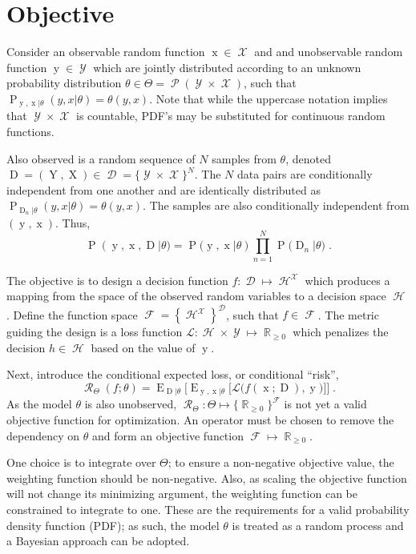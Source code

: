 \documentclass[12pt]{article}
\DeclareMathOperator{\xrm}{\mathrm{x}}
\DeclareMathOperator{\Xrm}{\mathrm{X}}
\DeclareMathOperator{\yrm}{\mathrm{y}}
\DeclareMathOperator{\Yrm}{\mathrm{Y}}
\DeclareMathOperator{\Drm}{\mathrm{D}}
\DeclareMathOperator{\Prm}{\mathrm{P}}
\DeclareMathOperator{\Erm}{\mathrm{E}}
\DeclareMathOperator{\Xcal}{\mathcal{X}}
\DeclareMathOperator{\Ycal}{\mathcal{Y}}
\DeclareMathOperator{\Dcal}{\mathcal{D}}
\DeclareMathOperator{\Hcal}{\mathcal{H}}
\DeclareMathOperator{\Fcal}{\mathcal{F}}
\DeclareMathOperator{\Rcal}{\mathcal{R}}
\DeclareMathOperator{\Pcal}{\mathcal{P}}
\DeclareMathOperator{\Rbb}{\mathbb{R}}
\begin{document}
\section{Objective}

Consider an observable random function $\xrm \in \Xcal$ and and unobservable random function $\yrm \in \Ycal$ which are jointly distributed according to an unknown probability distribution $\theta \in \Theta = \Pcal(\Ycal \times \Xcal)$, such that $\Prm_{\yrm,\xrm | \theta}(y,x | \theta) = \theta(y,x)$. Note that while the uppercase notation implies that $\Ycal \times \Xcal$ is countable, PDF's may be substituted for continuous random functions.

Also observed is a random sequence of $N$ samples from $\theta$, denoted $\Drm = ( \Yrm,\Xrm ) \in \Dcal = \{\Ycal \times \Xcal\}^N$. The $N$ data pairs are conditionally independent from one another and are identically distributed as $\Prm_{\Drm_n | \theta}(y,x | \theta) = \theta(y,x)$. The samples are also conditionally independent from $(\yrm,\xrm)$. Thus,
\begin{equation}
\Prm(\yrm,\xrm,\Drm | \theta) = \Prm(\yrm,\xrm | \theta) \prod_{n=1}^N \Prm\big( \Drm_n | \theta \big) \;.
\end{equation}

The objective is to design a decision function $f: \Dcal \mapsto \Hcal^{\Xcal}$ which produces a mapping from the space of the observed random variables to a decision space $\Hcal$. Define the function space $\Fcal = \left\{ {\Hcal^{\Xcal}} \right\}^{\Dcal}$, such that $f \in \Fcal$. The metric guiding the design is a loss function $\mathcal{L}: \Hcal \times \Ycal \mapsto \Rbb_{\geq 0}$ which penalizes the decision $h \in \Hcal$ based on the value of $\yrm$. 

Next, introduce the conditional expected loss, or conditional ``risk'',
\begin{equation} \label{eq:risk_cond}
\Rcal_{\Theta}(f ; \theta) = \Erm_{\Drm | \theta} \bigg[ \Erm_{\yrm,\xrm | \theta} \Big[ \mathcal{L}\big( f(\xrm;\Drm),\yrm \big) \Big] \bigg] \;.
\end{equation}
As the model $\theta$ is also unobserved, $\Rcal_{\Theta}: \Theta \mapsto \{ \Rbb_{\geq 0} \}^{\Fcal}$ is not yet a valid objective function for optimization. An operator must be chosen to remove the dependency on $\theta$ and form an objective function $\Fcal \mapsto \Rbb_{\geq 0}$.

One choice is to integrate over $\Theta$; to ensure a non-negative objective value, the weighting function should be non-negative. Also, as scaling the objective function will not change its minimizing argument, the weighting function can be constrained to integrate to one. These are the requirements for a valid probability density function (PDF); as such, the model $\theta$ is treated as a random process and a Bayesian approach can be adopted. 
\end{document}
